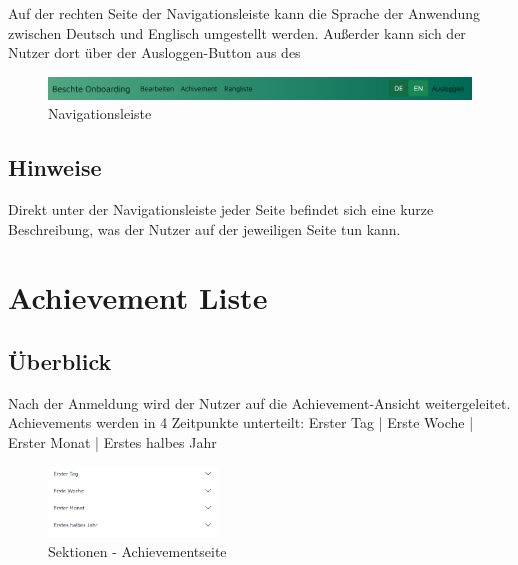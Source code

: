\documentclass[11pt]{article}
\begin{document}
Auf der rechten Seite der Navigationsleiste kann die Sprache der Anwendung zwischen Deutsch und Englisch umgestellt werden. Außerder kann sich der Nutzer dort
über der Ausloggen-Button aus des
\begin{figure}[H]
    \centering
    \includegraphics[width=\textwidth]{application/navbar.png}
    \caption{Navigationsleiste}
\end{figure}

\subsection{Hinweise}
Direkt unter der Navigationsleiste jeder Seite befindet sich eine kurze Beschreibung, was der Nutzer auf der jeweiligen Seite tun kann.


\section{Achievement Liste}
\subsection{Überblick}
Nach der Anmeldung wird der Nutzer auf die Achievement-Ansicht weitergeleitet. Achievements werden in 4 Zeitpunkte unterteilt:\newline
Erster Tag | Erste Woche | Erster Monat | Erstes halbes Jahr\newline
\begin{figure}
    \begin{center}
        \includegraphics[width=0.4\textwidth]{application/sections.png}
    \end{center}
    \caption{Sektionen - Achievementseite}
\end{figure}
\end{document}
